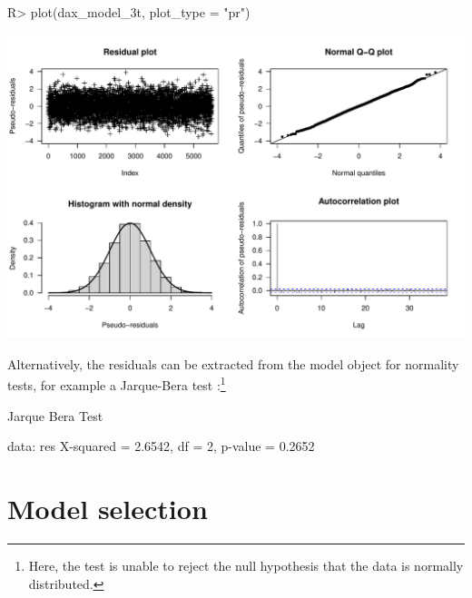 \documentclass[article]{jss}
\begin{document}
%
\begin{Schunk}
\begin{Sinput}
R> plot(dax_model_3t, plot_type = "pr")
\end{Sinput}
\end{Schunk}
\includegraphics{fhmm_oelschlaeger_adam_michels-dax-res}
%

Alternatively, the residuals can be extracted from the model object for normality tests, for example a Jarque-Bera test \citep{jar87}:\footnote{Here, the test is unable to reject the null hypothesis that the data is normally distributed.}

%
\begin{Schunk}
\begin{Soutput}
	Jarque Bera Test

data:  res
X-squared = 2.6542, df = 2, p-value = 0.2652
\end{Soutput}
\end{Schunk}
%

\section{Model selection} \label{sec:model_selection} %
\end{document}

